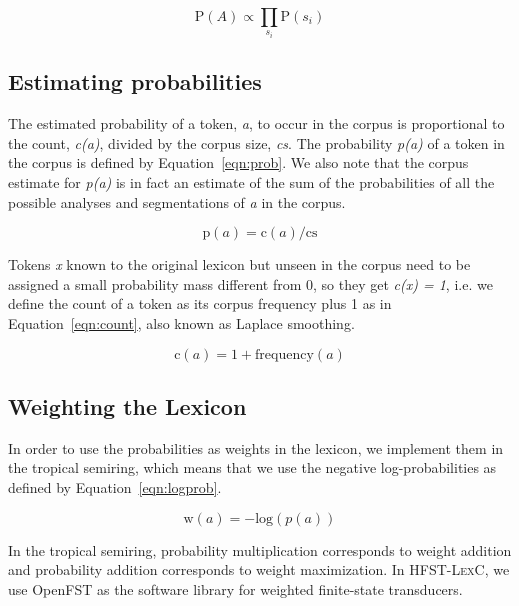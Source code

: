 \documentclass[a4paper]{article}
\begin{document}
\begin{equation}
  \label{eqn:prodprob}
  \mathrm{P}(A) \propto \prod_{s_i} \mathrm{P}(s_i)
\end{equation}

\subsection{Estimating probabilities}

The estimated probability of a token, \emph{a}, to occur in the corpus
is proportional to the count, \emph{c(a)}, divided by the corpus size,
\emph{cs}. The probability \emph{p(a)} of a token in the corpus is
defined by Equation~\ref{eqn:prob}. We also note that the corpus
estimate for \emph{p(a)} is in fact an estimate of the sum of the
probabilities of all the possible analyses and segmentations of
\emph{a} in the corpus.

\begin{equation}
  \label{eqn:prob}
  \mathrm{p}(a) = \mathrm{c}(a)/\mathrm{cs}
\end{equation}

Tokens \emph{x} known to the original lexicon but unseen in the corpus
need to be assigned a small probability mass different from 0, so they
get \emph{c(x) = 1}, i.e. we define the count of a token as its corpus
frequency plus 1 as in Equation~\ref{eqn:count}, also known as Laplace
smoothing.

\begin{equation}
  \label{eqn:count}
  \mathrm{c}(a) = 1 + \mathrm{frequency}(a)
\end{equation}

\subsection{Weighting the Lexicon}

In order to use the probabilities as weights in the lexicon, we
implement them in the tropical semiring, which means that we use the
negative log-probabilities as defined by Equation~\ref{eqn:logprob}.

\begin{equation}
  \label{eqn:logprob}
  \mathrm{w}(a) = -\mathrm{log}(p(a))
\end{equation}

In the tropical semiring, probability multiplication corresponds to
weight addition and probability addition corresponds to weight
maximization. In \textsc{HFST-LexC}, we use OpenFST \cite{openfst} as
the software library for weighted finite-state transducers.
\end{document}
